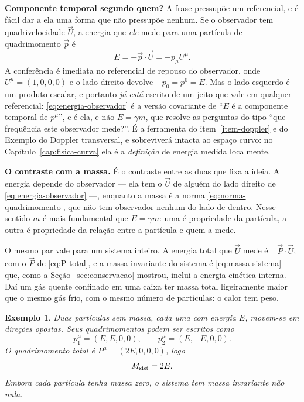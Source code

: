 \documentclass[12pt,a4paper,oneside]{book}
\theoremstyle{rgplain}
\newtheorem{example}{Exemplo}[chapter]
\theoremstyle{rgremark}
\begin{document}
\textbf{Componente temporal segundo quem?} A frase pressupõe um referencial, e
é fácil dar a ela uma forma que não pressupõe nenhum. Se o observador tem
quadrivelocidade $\vec U$, a energia que \emph{ele} mede para uma partícula de
quadrimomento $\vec p$ é
\begin{equation}
  E=-\vec p\cdot\vec U=-p_\mu U^\mu .
  \label{eq:energia-observador}
\end{equation}
A conferência é imediata no referencial de repouso do observador, onde
$U^\mu=(1,0,0,0)$ e o lado direito devolve $-p_0=p^0=E$. Mas o lado esquerdo é
um produto escalar, e portanto \emph{já está} escrito de um jeito que vale em
qualquer referencial: \eqref{eq:energia-observador} é a versão covariante de
``$E$ é a componente temporal de $p^\mu$'', e é ela, e não $E=\gamma m$, que
resolve as perguntas do tipo ``que frequência este observador mede?''. É a
ferramenta do item~\ref{item-doppler} e do Exemplo do Doppler transversal, e
sobreviverá intacta ao espaço curvo: no Capítulo~\ref{cap:fisica-curva} ela é
a \emph{definição} de energia medida localmente.

\textbf{O contraste com a massa.} É o contraste entre as duas que fixa a
ideia. A energia depende do observador --- ela tem o
$\vec U$ de alguém do lado direito de \eqref{eq:energia-observador} ---,
enquanto a massa é a norma \eqref{eq:norma-quadrimomento}, que não tem
observador nenhum do lado de dentro. Nesse sentido $m$ é mais fundamental que
$E=\gamma m$: uma é propriedade da partícula, a outra é propriedade da relação
entre a partícula e quem a mede.

O mesmo par vale para um sistema inteiro. A energia total que $\vec U$ mede é
$-\vec P\cdot\vec U$, com o $\vec P$ de \eqref{eq:P-total}, e a massa
invariante do sistema é \eqref{eq:massa-sistema} --- que, como a
Seção~\ref{sec:conservacao} mostrou, inclui a energia cinética interna. Daí um
gás quente confinado em uma caixa ter massa total ligeiramente maior que o
mesmo gás frio, com o mesmo número de partículas: o calor tem peso.

\begin{example}
Duas partículas sem massa, cada uma com energia $E$, movem-se em direções
opostas. Seus quadrimomentos podem ser escritos como
\[
  p_1^\mu=(E,E,0,0),\qquad p_2^\mu=(E,-E,0,0).
\]
O quadrimomento total é $P^\mu=(2E,0,0,0)$, logo
\[
  M_{\rm sist}=2E.
\]
Embora cada partícula tenha massa zero, o sistema tem massa invariante não
nula.
\end{example}
\end{document}

